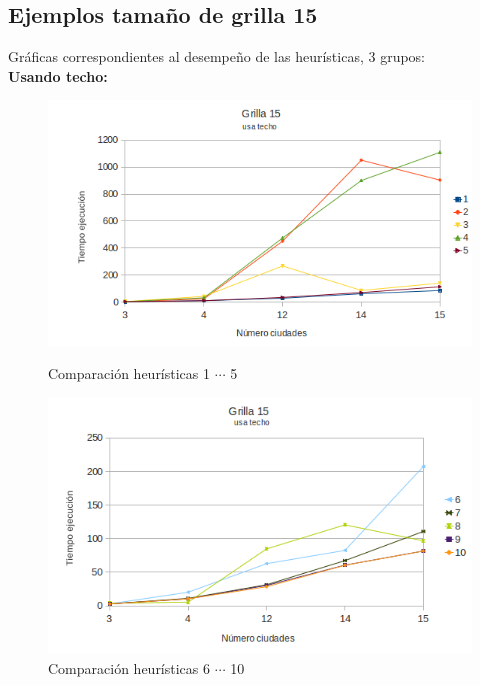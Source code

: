 \documentclass[10pt]{article}
\begin{document}

\newpage
\subsection{Ejemplos tamaño de grilla 15}

Gráficas correspondientes al desempeño de las heurísticas, 3 grupos:\\
\textbf{Usando techo:}

\begin{figure}[ht]
\begin{minipage}[b]{0.45\linewidth}
 \centering
 \includegraphics[width=\textwidth]{grilla15ceil0.png}
 \caption{Comparación heurísticas  1 $\cdots$ 5}
 \label{fig:grid15ceil0}
\end{minipage}
\hspace{0.5cm}
\begin{minipage}[b]{0.45\linewidth}
 
\centering
 \includegraphics[width=\textwidth]{grilla15ceil1.png}
 \caption{Comparación heurísticas  6 $\cdots$ 10}
 \label{fig:grid15ceil1}
\end{minipage}


\end{figure}
\end{document}
